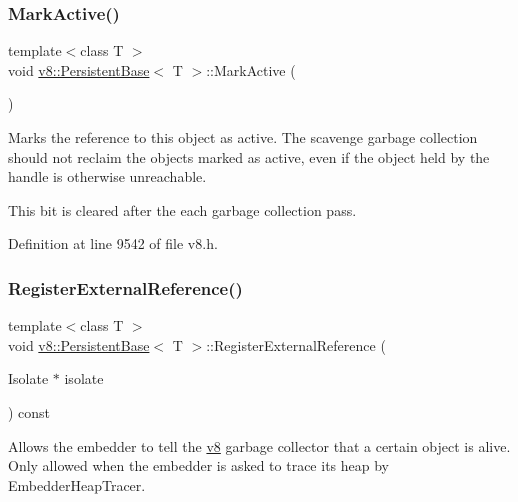 \mbox{\label{classv8_1_1PersistentBase_a7244edd33a45b7d95e566fce85e3f87d}} 
\subsubsection{\texorpdfstring{Mark\+Active()}{MarkActive()}}
{\footnotesize\ttfamily template$<$class T $>$ \\
void \mbox{\hyperlink{classv8_1_1PersistentBase}{v8\+::\+Persistent\+Base}}$<$ T $>$\+::Mark\+Active (\begin{DoxyParamCaption}{ }\end{DoxyParamCaption})}

Marks the reference to this object as active. The scavenge garbage collection should not reclaim the objects marked as active, even if the object held by the handle is otherwise unreachable.

This bit is cleared after the each garbage collection pass. 

Definition at line 9542 of file v8.\+h.

\mbox{\label{classv8_1_1PersistentBase_a427ad28478a6a208605fca3d39ce4bdf}} 
\subsubsection{\texorpdfstring{Register\+External\+Reference()}{RegisterExternalReference()}}
{\footnotesize\ttfamily template$<$class T $>$ \\
void \mbox{\hyperlink{classv8_1_1PersistentBase}{v8\+::\+Persistent\+Base}}$<$ T $>$\+::Register\+External\+Reference (\begin{DoxyParamCaption}\item[{Isolate $\ast$}]{isolate }\end{DoxyParamCaption}) const}

Allows the embedder to tell the \mbox{\hyperlink{namespacev8}{v8}} garbage collector that a certain object is alive. Only allowed when the embedder is asked to trace its heap by Embedder\+Heap\+Tracer. 

